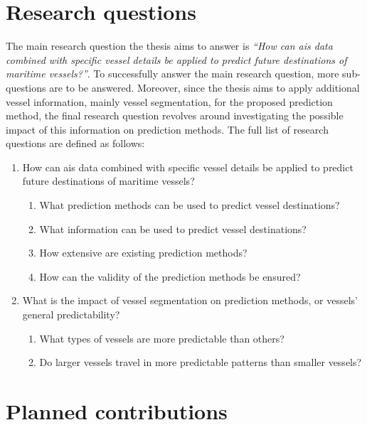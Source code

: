 \section{Research questions}
\label{sec:research_questions}

The main research question the thesis aims to answer is \textit{``How can \acrshort{ais} data combined with specific vessel details be applied to predict future destinations of maritime vessels?''}. To successfully answer the main research question, more sub-questions are to be answered. Moreover, since the thesis aims to apply additional vessel information, mainly vessel segmentation, for the proposed prediction method, the final research question revolves around investigating the possible impact of this information on prediction methods. The full list of research questions are defined as follows:

\begin{enumerate}
    \item How can \acrshort{ais} data combined with specific vessel details be applied to predict future destinations of maritime vessels?
    \begin{enumerate}
    \item What prediction methods can be used to predict vessel destinations?
    \item What information can be used to predict vessel destinations?
    \item How extensive are existing prediction methods?
    \item How can the validity of the prediction methods be ensured?
    \end{enumerate}
    \item What is the impact of vessel segmentation on prediction methods, or vessels' general predictability?
    \begin{enumerate}
    \item What types of vessels are more predictable than others?
    \item Do larger vessels travel in more predictable patterns than smaller vessels?
    \end{enumerate}
\end{enumerate}

\section{Planned contributions}

